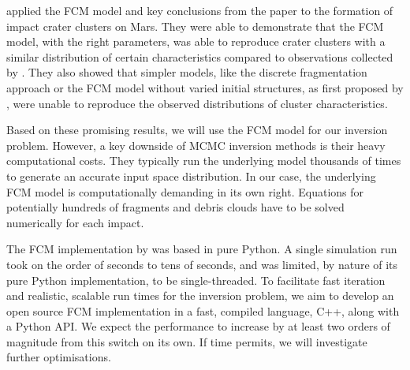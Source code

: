 \cite{newland2019CFM18} applied the FCM model and key conclusions from the \cite{wheeler2018atmospheric} paper to the formation of impact crater clusters on Mars.
They were able to demonstrate that the FCM model, with the right parameters, was able to reproduce crater clusters with a similar distribution of certain characteristics compared to observations collected by \cite{daubar2019recently}.
They also showed that simpler models, like the discrete fragmentation approach or the FCM model without varied initial structures, as first proposed by \cite{wheeler2017fragmentcloud}, were unable to reproduce the observed distributions of cluster characteristics.

Based on these promising results, we will use the FCM model for our inversion problem.
However, a key downside of MCMC inversion methods is their heavy computational costs.
They typically run the underlying model thousands of times to generate an accurate input space distribution.
In our case, the underlying FCM model is computationally demanding in its own right.
Equations for potentially hundreds of fragments and debris clouds have to be solved numerically for each impact.

The FCM implementation by \cite{newland2019CFM18} was based in pure Python.
A single simulation run took on the order of seconds to tens of seconds, and was limited, by nature of its pure Python implementation, to be single-threaded.
To facilitate fast iteration and realistic, scalable run times for the inversion problem, we aim to develop an open source FCM implementation in a fast, compiled language, C++, along with a Python API.
We expect the performance to increase by at least two orders of magnitude from this switch on its own.
If time permits, we will investigate further optimisations.
